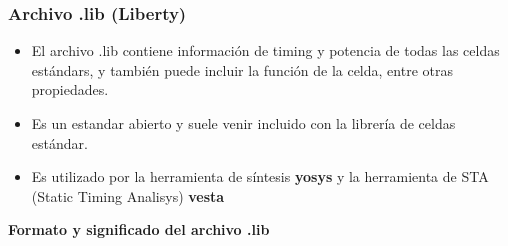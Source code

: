 \documentclass{beamer}
\begin{document}
\begin{frame}[fragile]
  \frametitle{ Archivo .lib (Liberty)  }
  \begin{itemize}
    \item El archivo .lib contiene información de timing y potencia de todas las celdas estándars, y también puede incluir la función de la celda, entre otras propiedades. 

    \item Es un estandar abierto y suele venir incluido con la librería de celdas estándar.

    \item Es utilizado por la herramienta de síntesis \textbf{yosys} y la herramienta de STA (Static Timing Analisys) \textbf{vesta}
  \end{itemize}
\end{frame}
\begin{frame}
\textbf{Formato y significado del archivo .lib} 
   \begin{figure}[ht]
      \centering
    \end{figure}
\end{frame}


\begin{frame}
  \begin{figure}[ht]
      \centering
    \end{figure}
  
\end{frame}
\end{document}
